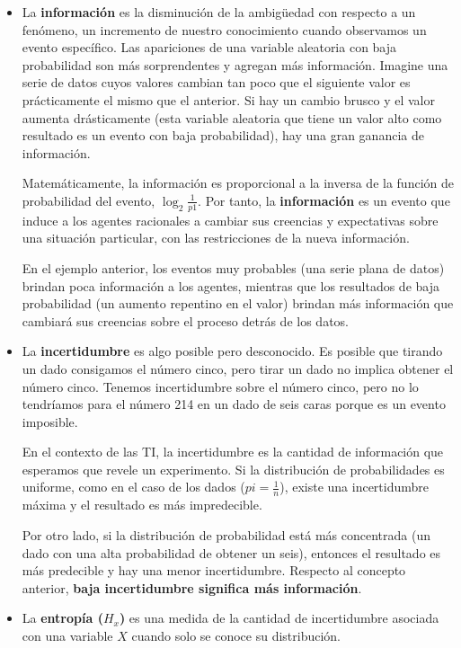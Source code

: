 \documentclass[a4paper,12pt]{article}
\begin{document}
\begin{itemize}[noitemsep, topsep=2pt]
	\item La \textbf{información} es la disminución de la ambigüedad con respecto a un fenómeno, un incremento de nuestro conocimiento cuando observamos un evento específico. Las apariciones de una variable aleatoria con baja probabilidad son más sorprendentes y agregan más información. Imagine una serie de datos cuyos valores cambian tan poco que el siguiente valor es prácticamente el mismo que el anterior. Si hay un cambio brusco y el valor aumenta drásticamente (esta variable aleatoria que tiene un valor alto como resultado es un evento con baja probabilidad), hay una gran ganancia de información. 
	
	Matemáticamente, la información es proporcional a la inversa de la función de probabilidad del evento, $\log_2 \frac{1}{p1}$. Por tanto, la \textbf{información} es un evento que induce a los agentes racionales a cambiar sus creencias y expectativas sobre una situación particular, con las restricciones de la nueva información. 
	
	En el ejemplo anterior, los eventos muy probables (una serie plana de datos) brindan poca información a los agentes, mientras que los resultados de baja probabilidad (un aumento repentino en el valor) brindan más información que cambiará sus creencias sobre el proceso detrás de los datos. 

\item La \textbf{incertidumbre} es algo posible pero desconocido. Es posible que tirando un dado consigamos el número cinco, pero tirar un dado no implica obtener el número cinco. Tenemos incertidumbre sobre el número cinco, pero no lo tendríamos para el número 214 en un dado de seis caras porque es un evento imposible. 

En el contexto de las TI, la incertidumbre es la cantidad de información que esperamos que revele un experimento. Si la distribución de probabilidades es uniforme, como en el caso de los dados ($pi = \frac{1}{n}$), existe una incertidumbre máxima y el resultado es más impredecible. 

Por otro lado, si la distribución de probabilidad está más concentrada (un dado con una alta probabilidad de obtener un seis), entonces el resultado es más predecible y hay una menor incertidumbre. Respecto al concepto anterior, \textbf{baja incertidumbre significa más información}. 

\item La \textbf{entropía ($H_x$)} es una medida de la cantidad de incertidumbre asociada con una variable $X$ cuando solo se conoce su distribución. 


\end{itemize}
\end{document}
